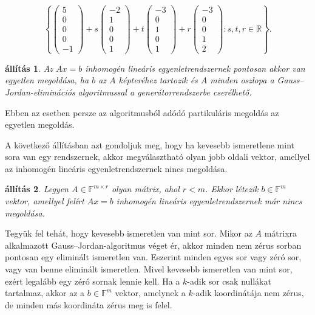 \documentclass[9pt, a4paper, showtrims]{memoir}
\makeatletter
\renewenvironment{proof}[1][\proofname]
    {\par\pushQED{\qed}%
    \normalfont \topsep6\p@\@plus6\p@\relax
    \trivlist
    \item[\hskip\labelsep
        \itshape
    #1\@addpunct{:}]\ignorespaces}
    {\popQED\endtrivlist\@endpefalse}
\theoremstyle{plain}
\newtheorem{proposition}{állítás}[chapter]
\theoremstyle{remark}
\theoremstyle{definition}
\makeatother
\begin{document}
\[
    \left\{
        \begin{pmatrix}
            5\\0\\0\\0\\-1
        \end{pmatrix}
        +s
        \begin{pmatrix}
            -2\\1\\0\\0\\1
        \end{pmatrix}
        +t
        \begin{pmatrix}
            -3\\0\\1\\0\\1
        \end{pmatrix}
        +r
        \begin{pmatrix}
            -3\\0\\0\\1\\2
        \end{pmatrix}
        :s,t,r\in\mathbb{R}
    \right\}.
\]
\begin{proposition}
    Az $Ax=b$ inhomogén lineáris egyenletrendszernek pontosan akkor van egyetlen 
    megoldása, ha $b$ az $A$ képteréhez tartozik és $A$ minden oszlopa a Gauss--Jordan-eliminációs algoritmussal  a generátorrendszerbe cserélhető.
\end{proposition}
Ebben az esetben persze az algoritmusból adódó partikuláris megoldás az egyetlen megoldás.

A következő állításban azt gondoljuk meg, hogy ha kevesebb ismeretlene mint sora van egy rendszernek, akkor megválasztható olyan jobb oldali vektor, amellyel az inhomogén lineáris egyenletrendszernek nincs megoldása.
\begin{proposition}
    Legyen $A\in\mathbb{F}^{m\times r}$ olyan mátrix, ahol $r<m$.
    Ekkor létezik $b\in\mathbb{F}^m$ vektor, 
    amellyel felírt $Ax=b$ inhomogén lineáris egyenletrendszernek már nincs megoldása.
\end{proposition}
\begin{proof}
    Tegyük fel tehát, hogy kevesebb ismeretlen van mint sor.
    Mikor az $A$ mátrixra alkalmazott Gauss--Jordan-algoritmus  véget ér, 
    akkor minden nem zérus sorban pontosan egy eliminált ismeretlen van.
    Eszerint minden egyes sor vagy zéró sor, 
    vagy van benne eliminált ismeretlen.
    Mivel kevesebb ismeretlen van mint sor, 
    ezért legalább egy zéró sornak lennie kell.
    Ha a $k$-adik sor csak nullákat tartalmaz, akkor az a $b\in\mathbb{F}^m$ vektor,
    amelynek a $k$-adik koordinátája nem zérus, de minden más koordináta zérus meg is felel.
\end{proof}
\end{document}
